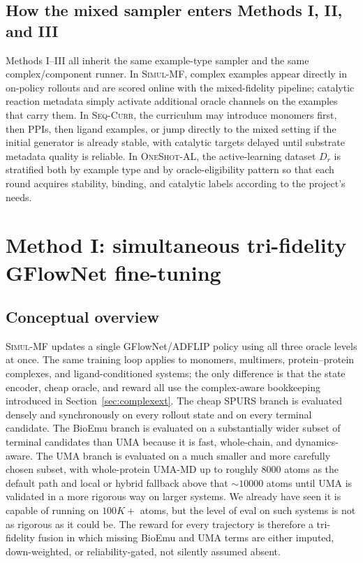 \documentclass[11pt]{article}
\newcommand{\methodI}{\textsc{Simul-MF}}
\newcommand{\methodII}{\textsc{Seq-Curr}}
\newcommand{\methodIII}{\textsc{OneShot-AL}}
\begin{document}
	
	\subsection{How the mixed sampler enters Methods I, II, and III}
	
	Methods I--III all inherit the same example-type sampler and the same complex/component runner. In \methodI{}, complex examples appear directly in on-policy rollouts and are scored online with the mixed-fidelity pipeline; catalytic reaction metadata simply activate additional oracle channels on the examples that carry them. In \methodII{}, the curriculum may introduce monomers first, then PPIs, then ligand examples, or jump directly to the mixed setting if the initial generator is already stable, with catalytic targets delayed until substrate metadata quality is reliable. In \methodIII{}, the active-learning dataset $D_r$ is stratified both by example type and by oracle-eligibility pattern so that each round acquires stability, binding, and catalytic labels according to the project's needs.
	
	\section{Method I: simultaneous tri-fidelity GFlowNet fine-tuning}
	\label{sec:method1}
	
	\subsection{Conceptual overview}
	
	\methodI{} updates a single GFlowNet/ADFLIP policy using all three oracle levels at once. The same training loop applies to monomers, multimers, protein--protein complexes, and ligand-conditioned systems; the only difference is that the state encoder, cheap oracle, and reward all use the complex-aware bookkeeping introduced in Section~\ref{sec:complexext}. The cheap SPURS branch is evaluated densely and synchronously on every rollout state and on every terminal candidate. The BioEmu branch is evaluated on a substantially wider subset of terminal candidates than UMA because it is fast, whole-chain, and dynamics-aware. The UMA branch is evaluated on a much smaller and more carefully chosen subset, with whole-protein UMA-MD up to roughly $8000$ atoms as the default path and local or hybrid fallback above that $\sim 10000$ atoms until UMA is validated in a more rigorous way on larger systems. We already have seen it is capable of running on $100K+$ atoms, but the level of eval on such systems is not as rigorous as it could be. The reward for every trajectory is therefore a tri-fidelity fusion in which missing BioEmu and UMA terms are either imputed, down-weighted, or reliability-gated, not silently assumed absent.
	
\end{document}
